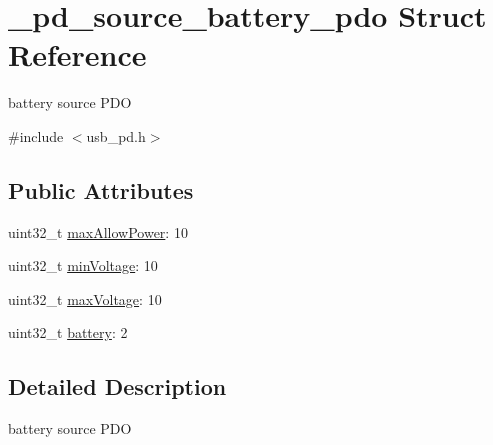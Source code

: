 \hypertarget{struct__pd__source__battery__pdo}{\section{\-\_\-pd\-\_\-source\-\_\-battery\-\_\-pdo Struct Reference}
\label{struct__pd__source__battery__pdo}
}


battery source P\-D\-O  




{\ttfamily \#include $<$usb\-\_\-pd.\-h$>$}

\subsection*{Public Attributes}
\begin{DoxyCompactItemize}
\item 
uint32\-\_\-t \hyperlink{struct__pd__source__battery__pdo_ae4498258205f03a10afdb32e445a57ef}{max\-Allow\-Power}\-: 10
\item 
uint32\-\_\-t \hyperlink{struct__pd__source__battery__pdo_a5c799cc37ea460e9bfeea8a05242cf54}{min\-Voltage}\-: 10
\item 
uint32\-\_\-t \hyperlink{struct__pd__source__battery__pdo_af818fd645542287499a65f559ef6d571}{max\-Voltage}\-: 10
\item 
uint32\-\_\-t \hyperlink{struct__pd__source__battery__pdo_a0cae5fa1b6136b1a9db95d182ec7122a}{battery}\-: 2
\end{DoxyCompactItemize}


\subsection{Detailed Description}
battery source P\-D\-O 

